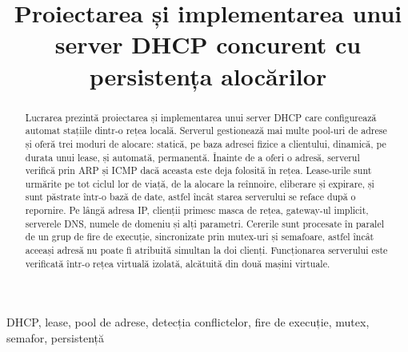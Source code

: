 \documentclass[conference]{IEEEtran}
\begin{document}
\title{Proiectarea și implementarea unui server DHCP concurent cu persistența alocărilor}

\author{
\and
{}
}

\maketitle

\begin{abstract}
Lucrarea prezintă proiectarea și implementarea unui server DHCP care configurează automat stațiile dintr-o rețea locală. Serverul gestionează mai multe pool-uri de adrese și oferă trei moduri de alocare: statică, pe baza adresei fizice a clientului, dinamică, pe durata unui lease, și automată, permanentă. Înainte de a oferi o adresă, serverul verifică prin ARP și ICMP dacă aceasta este deja folosită în rețea. Lease-urile sunt urmărite pe tot ciclul lor de viață, de la alocare la reînnoire, eliberare și expirare, și sunt păstrate într-o bază de date, astfel încât starea serverului se reface după o repornire. Pe lângă adresa IP, clienții primesc masca de rețea, gateway-ul implicit, serverele DNS, numele de domeniu și alți parametri. Cererile sunt procesate în paralel de un grup de fire de execuție, sincronizate prin mutex-uri și semafoare, astfel încât aceeași adresă nu poate fi atribuită simultan la doi clienți. Funcționarea serverului este verificată într-o rețea virtuală izolată, alcătuită din două mașini virtuale.
\end{abstract}

\begin{IEEEkeywords}
DHCP, lease, pool de adrese, detecția conflictelor, fire de execuție, mutex, semafor, persistență
\end{IEEEkeywords}
\end{document}
